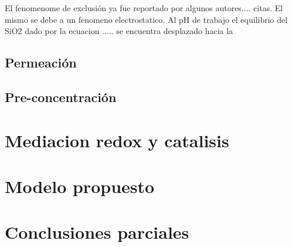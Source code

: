 	El fenomenome de exclusión ya fue reportado por algunos autores.... citas. El mismo se debe a un fenomeno electrostatico. Al pH de trabajo el equilibrio del SiO2 dado por la ecuacion ..... se encuentra desplazado hacia la

	\subsection{Permeación}

	\subsection{Pre-concentración}

\section{Mediacion redox y catalisis}

\section{Modelo propuesto}

\section{Conclusiones parciales}





	

